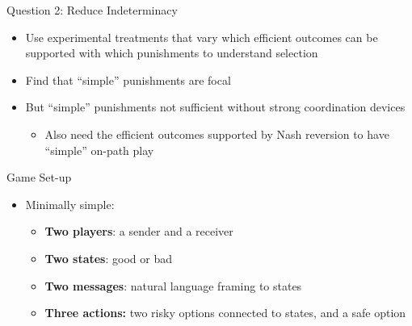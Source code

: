 \documentclass{beamer}
\begin{document}
\begin{frame}{Question 2: Reduce Indeterminacy}
    \begin{itemize}
        \item Use experimental treatments that vary which efficient outcomes can
        be supported with which punishments to understand selection
        \item Find that ``simple'' punishments are focal
        \item But ``simple'' punishments not sufficient without strong coordination
        devices
            \begin{itemize}
                \item Also need the efficient outcomes supported by Nash reversion to have
                ``simple'' on-path play
            \end{itemize}
    \end{itemize}
\end{frame}

\begin{frame}{Game Set-up}
    \begin{itemize}
    \item Minimally simple:
        \begin{itemize}
            \item \textbf{Two players}: a sender and a receiver
            \item \textbf{Two states}: good or bad
            \item \textbf{Two messages}: natural language framing to states
            \item \textbf{Three actions:} two risky options connected to states, and
            a safe option
        \end{itemize}
    \end{itemize}
\end{frame}
\end{document}
